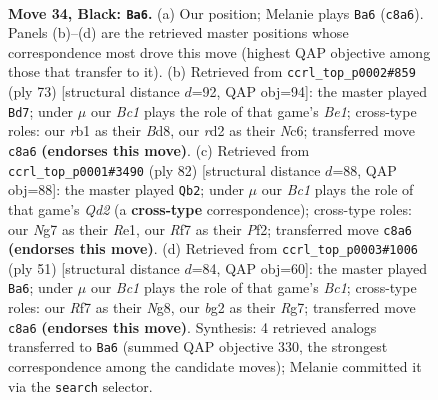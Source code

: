\documentclass[11pt]{article}
\begin{document}
\clearpage

\begin{figure}[p]\centering
\begin{subfigure}{0.46\textwidth}\centering
\resizebox{\linewidth}{!}{%
\newchessgame
\chessboard[
  setfen={1rb3k1/p1nqbrn1/8/P1p2p1p/3p1Pp1/1P4P1/Q2RP1BP/1RBNN1K1 b - - 1 34},
  showmover=false,
  pgfstyle=straightmove, color=movearrow, markmove={c8-a6}
]}
\caption{}
\end{subfigure}\hfill
\begin{subfigure}{0.46\textwidth}\centering
\resizebox{\linewidth}{!}{%
\newchessgame
\chessboard[
  setfen={r1qbb3/1pp4k/2n2p2/PN2p2r/R3P1p1/3P2Pp/3BBP1P/R2Q2K1 b - - 2 37},
  showmover=false,
  pgfstyle=straightmove, color=movearrow, markmove={e8-d7}
]}
\caption{}
\end{subfigure}
\\[4pt]
\begin{subfigure}{0.46\textwidth}\centering
\resizebox{\linewidth}{!}{%
\newchessgame
\chessboard[
  setfen={3q3r/p1r1bpk1/1pbp2p1/4p2p/P1P1P3/1PNR1B1P/3Q1PP1/4R1K1 w - - 25 42},
  showmover=false,
  pgfstyle=straightmove, color=movearrow, markmove={d2-b2}
]}
\caption{}
\end{subfigure}\hfill
\begin{subfigure}{0.46\textwidth}\centering
\resizebox{\linewidth}{!}{%
\newchessgame
\chessboard[
  setfen={r1bq2nk/2p3rp/3p1b2/PNpP1p2/2P1pP2/R3B3/4B1PP/2Q2R1K b - - 2 26},
  showmover=false,
  pgfstyle=straightmove, color=movearrow, markmove={c8-a6}
]}
\caption{}
\end{subfigure}
\caption{\textbf{Move 34, Black: \texttt{Ba6}.} (a) Our position; Melanie plays \texttt{Ba6} (\texttt{c8a6}). Panels (b)--(d) are the retrieved master positions whose correspondence most drove this move (highest QAP objective among those that transfer to it). (b) Retrieved from \texttt{ccrl\_top\_p0002\#859} (ply 73) [structural distance $d$=92, QAP obj=94]: the master played \texttt{Bd7}; under $\mu$ our \emph{Bc1} plays the role of that game's \emph{Be1}; cross-type roles: our \emph{r}b1 as their \emph{B}d8, our \emph{r}d2 as their \emph{N}c6; transferred move \texttt{c8a6} \textbf{(endorses this move)}. (c) Retrieved from \texttt{ccrl\_top\_p0001\#3490} (ply 82) [structural distance $d$=88, QAP obj=88]: the master played \texttt{Qb2}; under $\mu$ our \emph{Bc1} plays the role of that game's \emph{Qd2} (a \textbf{cross-type} correspondence); cross-type roles: our \emph{N}g7 as their \emph{R}e1, our \emph{R}f7 as their \emph{P}f2; transferred move \texttt{c8a6} \textbf{(endorses this move)}. (d) Retrieved from \texttt{ccrl\_top\_p0003\#1006} (ply 51) [structural distance $d$=84, QAP obj=60]: the master played \texttt{Ba6}; under $\mu$ our \emph{Bc1} plays the role of that game's \emph{Bc1}; cross-type roles: our \emph{R}f7 as their \emph{N}g8, our \emph{b}g2 as their \emph{R}g7; transferred move \texttt{c8a6} \textbf{(endorses this move)}. Synthesis: 4 retrieved analogs transferred to \texttt{Ba6} (summed QAP objective 330, the strongest correspondence among the candidate moves); Melanie committed it via the \texttt{search} selector.}
\label{fig:thought-m67}
\end{figure}
\end{document}
